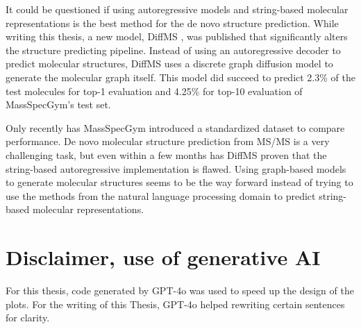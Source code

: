 It could be questioned if using autoregressive models and string-based molecular representations is the best method for the de novo structure prediction.
While writing this thesis, a new model, DiffMS \cite{bohde2025diffms}, was published that significantly alters the structure predicting pipeline.
Instead of using an autoregressive decoder to predict molecular structures, DiffMS uses a discrete graph diffusion model to generate the molecular graph itself.
This model did succeed to predict 2.3\% of the test molecules for top-1 evaluation and 4.25\% for top-10 evaluation of MassSpecGym's test set.

Only recently has MassSpecGym introduced a standardized dataset to compare performance. De novo molecular structure prediction from \ac{MS/MS} is a very challenging task,
but even within a few months has DiffMS proven that the string-based autoregressive implementation is flawed.
Using graph-based models to generate molecular structures seems to be the way forward instead of trying to use the methods from the natural language processing domain to predict string-based molecular representations.

\newpage
\section*{Disclaimer, use of generative AI}

For this thesis, code generated by GPT-4o was used to speed up the design of the plots.
For the writing of this Thesis, GPT-4o helped rewriting certain sentences for clarity.